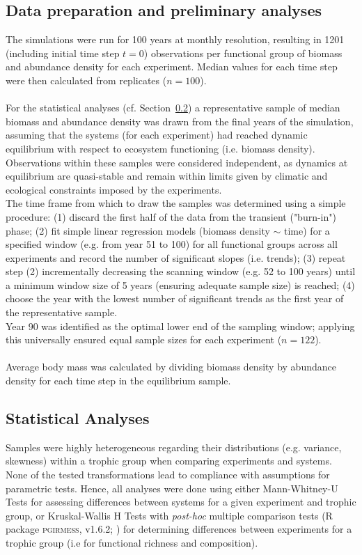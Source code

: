 \subsection{Data preparation and preliminary analyses}
The simulations were run for 100 years at monthly resolution, resulting in 1201 (including initial time step $t = 0$) observations per functional group of biomass and abundance density for each experiment. Median values for each time step were then calculated from replicates ($n = 100$). 
\\\\
For the statistical analyses (cf. Section~\ref{chap:mat:analysis:stats}) a representative sample of median biomass and abundance density was drawn from the final years of the simulation, assuming that the systems (for each experiment) had reached dynamic equilibrium with respect to ecosystem functioning (i.e. biomass density). 
Observations within these samples were considered independent, as dynamics at equilibrium are quasi-stable and remain within limits given by climatic and ecological constraints imposed by the experiments. \\
The time frame from which to draw the samples was determined using a simple procedure: (1) discard the first half of the data from the transient ("burn-in") phase; (2) fit simple linear regression models (biomass density $\sim$ time) for a specified window (e.g. from year 51 to 100) for all functional groups  across all experiments and record the number of significant slopes (i.e. trends); (3) repeat step (2) incrementally decreasing the scanning window (e.g. 52 to 100 years) until a minimum window size of 5 years (ensuring adequate sample size) is reached; (4) choose the year with the lowest number of significant trends as the first year of the representative sample.\\
Year 90 was  identified as the optimal lower end of the sampling window; applying this universally ensured equal sample sizes for each experiment ($n = 122$).\\\\
Average body mass was calculated by dividing  biomass density by abundance density for each time step in the equilibrium sample.

\subsection{Statistical Analyses}
\label{chap:mat:analysis:stats}
Samples were highly heterogeneous regarding their distributions (e.g. variance, skewness) within a trophic group when comparing experiments and systems. None of the tested transformations lead to compliance with assumptions for parametric tests. Hence, all analyses were done using either Mann-Whitney-U Tests \citep{Hollander2013} for assessing differences between systems for a given experiment and trophic group, or 
Kruskal-Wallis H Tests with \textit{post-hoc} multiple comparison tests (R package \textsc{pgirmess}, v1.6.2; \citealp{Siegel1988}) for determining differences between experiments for a trophic group (i.e for functional richness and composition). 
